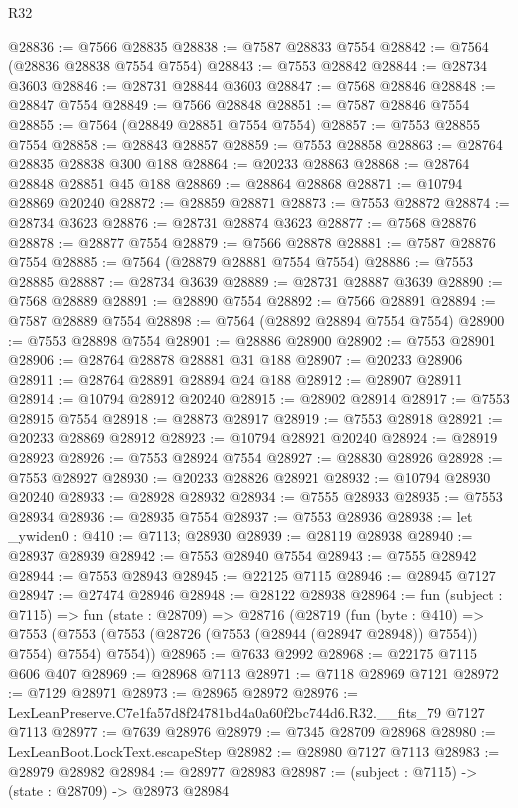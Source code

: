 \begin{lexlean}{R32}
\begin{coremodule}
@28836 := @7566 @28835
@28838 := @7587 @28833 @7554
@28842 := @7564 (@28836 @28838 @7554 @7554)
@28843 := @7553 @28842
@28844 := @28734 @3603
@28846 := @28731 @28844 @3603
@28847 := @7568 @28846
@28848 := @28847 @7554
@28849 := @7566 @28848
@28851 := @7587 @28846 @7554
@28855 := @7564 (@28849 @28851 @7554 @7554)
@28857 := @7553 @28855 @7554
@28858 := @28843 @28857
@28859 := @7553 @28858
@28863 := @28764 @28835 @28838 @300 @188
@28864 := @20233 @28863
@28868 := @28764 @28848 @28851 @45 @188
@28869 := @28864 @28868
@28871 := @10794 @28869 @20240
@28872 := @28859 @28871
@28873 := @7553 @28872
@28874 := @28734 @3623
@28876 := @28731 @28874 @3623
@28877 := @7568 @28876
@28878 := @28877 @7554
@28879 := @7566 @28878
@28881 := @7587 @28876 @7554
@28885 := @7564 (@28879 @28881 @7554 @7554)
@28886 := @7553 @28885
@28887 := @28734 @3639
@28889 := @28731 @28887 @3639
@28890 := @7568 @28889
@28891 := @28890 @7554
@28892 := @7566 @28891
@28894 := @7587 @28889 @7554
@28898 := @7564 (@28892 @28894 @7554 @7554)
@28900 := @7553 @28898 @7554
@28901 := @28886 @28900
@28902 := @7553 @28901
@28906 := @28764 @28878 @28881 @31 @188
@28907 := @20233 @28906
@28911 := @28764 @28891 @28894 @24 @188
@28912 := @28907 @28911
@28914 := @10794 @28912 @20240
@28915 := @28902 @28914
@28917 := @7553 @28915 @7554
@28918 := @28873 @28917
@28919 := @7553 @28918
@28921 := @20233 @28869 @28912
@28923 := @10794 @28921 @20240
@28924 := @28919 @28923
@28926 := @7553 @28924 @7554
@28927 := @28830 @28926
@28928 := @7553 @28927
@28930 := @20233 @28826 @28921
@28932 := @10794 @28930 @20240
@28933 := @28928 @28932
@28934 := @7555 @28933
@28935 := @7553 @28934
@28936 := @28935 @7554
@28937 := @7553 @28936
@28938 := let _ywiden0 : @410 := @7113; @28930
@28939 := @28119 @28938
@28940 := @28937 @28939
@28942 := @7553 @28940 @7554
@28943 := @7555 @28942
@28944 := @7553 @28943
@28945 := @22125 @7115
@28946 := @28945 @7127
@28947 := @27474 @28946
@28948 := @28122 @28938
@28964 := fun (subject : @7115) =>
  fun (state : @28709) =>
  @28716
    (@28719
      (fun (byte : @410) =>
      @7553 (@7553 (@7553 (@28726 (@7553 (@28944 (@28947 @28948)) @7554)) @7554) @7554) @7554))
@28965 := @7633 @2992
@28968 := @22175 @7115 @606 @407
@28969 := @28968 @7113
@28971 := @7118 @28969 @7121
@28972 := @7129 @28971
@28973 := @28965 @28972
@28976 := LexLeanPreserve.C7e1fa57d8f24781bd4a0a60f2bc744d6.R32.__fits_79 @7127 @7113
@28977 := @7639 @28976
@28979 := @7345 @28709 @28968
@28980 := LexLeanBoot.LockText.escapeStep
@28982 := @28980 @7127 @7113
@28983 := @28979 @28982
@28984 := @28977 @28983
@28987 := (subject : @7115) -> (state : @28709) -> @28973 @28984

\end{coremodule}
\end{lexlean}
